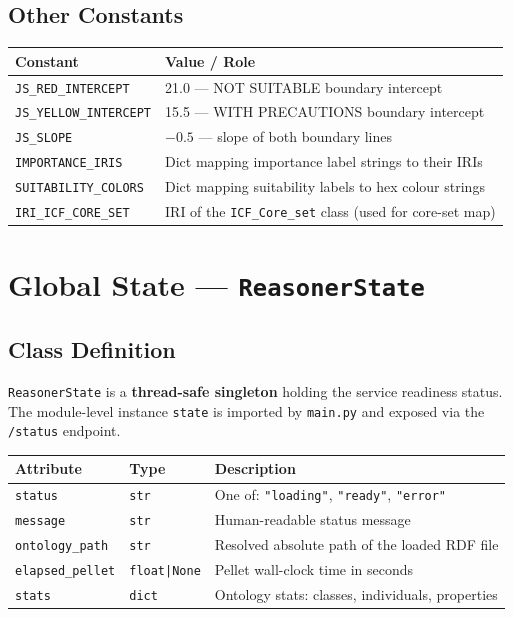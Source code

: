 ﻿\documentclass[12pt,a4paper]{article}
\begin{document}
\subsection{Other Constants}

\begin{longtable}{@{}P{5cm}P{9.5cm}@{}}
\toprule
\textbf{Constant} & \textbf{Value / Role} \\
\midrule
\endhead
\texttt{JS\_RED\_INTERCEPT} & 21.0 --- NOT SUITABLE boundary intercept \\
\texttt{JS\_YELLOW\_INTERCEPT} & 15.5 --- WITH PRECAUTIONS boundary intercept \\
\texttt{JS\_SLOPE} & $-0.5$ --- slope of both boundary lines \\
\texttt{IMPORTANCE\_IRIS} & Dict mapping importance label strings to their IRIs \\
\texttt{SUITABILITY\_COLORS} & Dict mapping suitability labels to hex colour strings \\
\texttt{IRI\_ICF\_CORE\_SET} & IRI of the \texttt{ICF\_Core\_set} class (used for core-set map) \\
\bottomrule
\end{longtable}

\clearpage
\section{Global State --- \texttt{ReasonerState}}

\subsection{Class Definition}

\texttt{ReasonerState} is a \textbf{thread-safe singleton} holding the service readiness status. The module-level instance \texttt{state} is imported by \texttt{main.py} and exposed via the \texttt{/status} endpoint.

\begin{longtable}{@{}P{3cm}P{2.5cm}P{9cm}@{}}
\toprule
\textbf{Attribute} & \textbf{Type} & \textbf{Description} \\
\midrule
\endhead
\texttt{status} & \texttt{str} & One of: \texttt{"loading"}, \texttt{"ready"}, \texttt{"error"} \\
\texttt{message} & \texttt{str} & Human-readable status message \\
\texttt{ontology\_path} & \texttt{str} & Resolved absolute path of the loaded RDF file \\
\texttt{elapsed\_pellet} & \texttt{float|None} & Pellet wall-clock time in seconds \\
\texttt{stats} & \texttt{dict} & Ontology stats: classes, individuals, properties \\
\bottomrule
\end{longtable}
\end{document}
